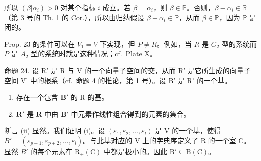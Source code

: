 所以 \((\beta |\alpha_{i}) > 0\) 对某个指标 \(i\) 成立。若 \(\beta = \alpha_{i}\)，则 \(\beta \in \mathbb{P}\)。否则，\(\beta - \alpha_{i} \in \mathbb{R}\)（第 3 号的 Th. 1 的 Cor.），所以由归纳假设 \(\beta - \alpha_{i} \in \mathbb{P}\)，从而 \(\beta \in \mathbb{P}\)，因为 \(\mathbb{P}\) 是闭的。

Prop. 23 的条件可以在 \(V_{1} = V\) 下实现，但 \(P \neq R\)。例如，当 \(R\) 是 \(G_{2}\) 型的系统而 \(P\) 是 \(A_{2}\) 型的系统时就是这种情况；cf.~Plate X。

命题 24. 设 R' 是 R 与 V 的一个向量子空间的交，从而 R' 是它所生成的向量子空间 V' 中的根系（cf.~命题 4 的推论，第 1 号）。设 B' 是 R' 的一个基。

\begin{enumerate}
\def\labelenumi{(\roman{enumi})}
\item
  存在一个包含 \(\mathbf{B}'\) 的 R 的基。
\item
  \(\mathbf{R}'\) 是 \(\mathbf{R}\) 中由 \(\mathbf{B}'\) 中元素作线性组合得到的元素的集合。
\end{enumerate}

断言 (ii) 显然。我们证明 (i)。设 \((\varepsilon_{1},\varepsilon_{2},\ldots,\varepsilon_{l})\) 是 V 的一个基，使得 \(B' = (\varepsilon_{p+1},\varepsilon_{p+2},\ldots,\varepsilon_{l})\)。与此基对应的 V 上的字典序定义了 R 的一个室 C。显然 \(B'\) 的每个元素在 \(\mathrm{R}_{+}(\mathrm{C})\) 中都是极小的。因此 \(\mathrm{B}' \subseteq \mathrm{B}(\mathrm{C})\)。

